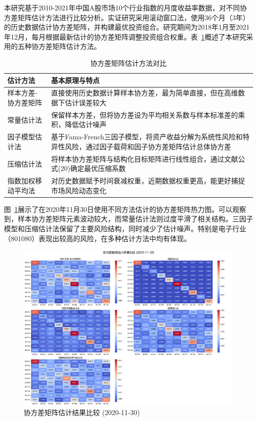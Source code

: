 \documentclass[12pt, a4paper]{article}
\begin{document}
本研究基于2010-2021年中国A股市场10个行业指数的月度收益率数据，对不同协方差矩阵估计方法进行比较分析。实证研究采用滚动窗口法，使用36个月（3年）的历史数据估计协方差矩阵，并构建最优投资组合。研究期间为2018年1月至2021年12月，每月根据最新估计的协方差矩阵调整投资组合权重。表~\ref{tab:cov_methods}概述了本研究采用的五种协方差矩阵估计方法。

\begin{table}[htbp]
\centering
\caption{协方差矩阵估计方法对比}
\label{tab:cov_methods}
\begin{tabular}{lp{10cm}}
\toprule
\textbf{估计方法} & \textbf{基本原理与特点} \\
\midrule
样本方差-协方差矩阵 & 直接使用历史数据计算样本协方差，最为简单直接，但在高维数据下估计误差较大 \\
常量估计法 & 保留样本方差，但将协方差设为平均相关系数与样本标准差的乘积，降低估计噪声 \\
因子模型估计法 & 基于Fama-French三因子模型，将资产收益分解为系统性风险和特异性风险，通过因子载荷和因子协方差矩阵估计总体协方差 \\
压缩估计法 & 将样本协方差矩阵与结构化目标矩阵进行线性组合，通过文献公式(20)确定最优压缩系数 \\
指数加权移动平均法 & 对历史数据赋予时间衰减权重，近期数据权重更高，能更好捕捉市场风险动态变化 \\
\bottomrule
\end{tabular}
\end{table}

图~\ref{fig:cov_heatmap}展示了在2020年11月30日使用不同方法估计的协方差矩阵热力图。可以观察到，样本协方差矩阵元素波动较大，而常量估计法则过度平滑了相关结构。三因子模型和压缩估计法保留了主要风险结构，同时减少了估计噪声。特别是电子行业（801080）表现出较高的风险，在多种估计方法中均有体现。

\begin{figure}[htbp]
\centering
\includegraphics[width=\textwidth]{./img/cov_comparison_20201130.png}
\caption{协方差矩阵估计结果比较 (2020-11-30)}
\label{fig:cov_heatmap}
\end{figure}
\end{document}
